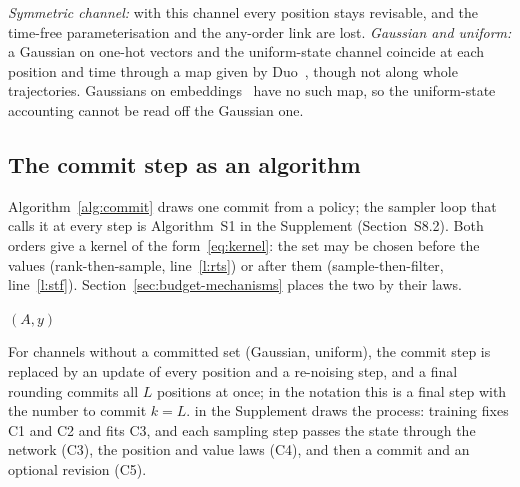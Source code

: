 \emph{Symmetric channel:} with this channel every position stays revisable, and the time-free parameterisation and the any-order link are lost. %
\emph{Gaussian and uniform:} a Gaussian on one-hot vectors and the uniform-state channel coincide at each position and time through a map given by Duo~\cite{arXiv:2506.10892}, though not along whole trajectories. Gaussians on embeddings~\cite{arXiv:2205.14217,arXiv:2211.15089,arXiv:2305.18619} have no such map, so the uniform-state accounting cannot be read off the Gaussian one. %

\subsection{The commit step as an algorithm}
\label{sec:notation-alg}

Algorithm~\ref{alg:commit} draws one commit from a policy; the sampler loop that calls it at every step is Algorithm~S1 in the Supplement (Section~S8.2). Both orders give a kernel of the form~\eqref{eq:kernel}: the set may be chosen before the values (rank-then-sample, line~\ref{l:rts}) or after them (sample-then-filter, line~\ref{l:stf}). Section~\ref{sec:budget-mechanisms} places the two by their laws. %

\begin{algorithm}[t]
\caption{\textsc{Commit}: one draw from a commit kernel}
\label{alg:commit}
\Return $(A,y)$\;
\end{algorithm}
For channels without a committed set (Gaussian, uniform), the commit step is replaced by an update of every position and a re-noising step, and a final rounding commits all $L$ positions at once; in the notation this is a final step with the number to commit $k=L$. \suppFigFormalism{} in the Supplement draws the process: training fixes C1 and C2 and fits C3, and each sampling step passes the state through the network (C3), the position and value laws (C4), and then a commit and an optional revision (C5). %
